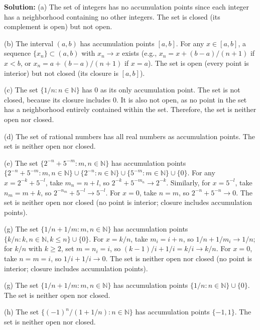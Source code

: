 \textbf{Solution:} 
(a) The set of integers has no accumulation points since each integer has a neighborhood containing no other integers. The set is closed (its complement is open) but not open.

(b) The interval $(a,b)$ has accumulation points $[a,b]$. For any $x \in [a,b]$, a sequence $\{x_n\} \subset (a,b)$ with $x_n \to x$ exists (e.g., $x_n = x + (b-a)/(n+1)$ if $x < b$, or $x_n = a + (b-a)/(n+1)$ if $x = a$). The set is open (every point is interior) but not closed (its closure is $[a,b]$).

(c) The set $\{1/n : n \in \mathbb{N}\}$ has 0 as its only accumulation point. The set is not closed, because its closure includes 0. It is also not open, as no point in the set has a neighborhood entirely contained within the set. Therefore, the set is neither open nor closed.


(d) The set of rational numbers has all real numbers as accumulation points. The set is neither open nor closed.

(e) The set $\{2^{-n} + 5^{-m} : m,n \in \mathbb{N}\}$ has accumulation points $\{2^{-n} + 5^{-m} : m,n \in \mathbb{N}\} \cup \{2^{-n} : n \in \mathbb{N}\} \cup \{5^{-m} : m \in \mathbb{N}\} \cup \{0\}$. For any $x = 2^{-k} + 5^{-l}$, take $m_n = n + l$, so $2^{-k} + 5^{-m_n} \to 2^{-k}$. Similarly, for $x = 5^{-l}$, take $n_m = m + k$, so $2^{-n_m} + 5^{-l} \to 5^{-l}$. For $x = 0$, take $n = m$, so $2^{-n} + 5^{-n} \to 0$. The set is neither open nor closed (no point is interior; closure includes accumulation points).

(g) The set $\{1/n + 1/m : m,n \in \mathbb{N}\}$ has accumulation points $\{k/n : k,n \in \mathbb{N}, k \leq n\} \cup \{0\}$. For $x = k/n$, take $m_i = i + n$, so $1/n + 1/m_i \to 1/n$; for $k/n$ with $k \geq 2$, set $m = n_i = i$, so $(k-1)/i + 1/i = k/i \to k/n$. For $x = 0$, take $n = m = i$, so $1/i + 1/i \to 0$. The set is neither open nor closed (no point is interior; closure includes accumulation points).

(g) The set $\{1/n + 1/m : m,n \in \mathbb{N}\}$ has accumulation points $\{1/n : n \in \mathbb{N}\} \cup \{0\}$. The set is neither open nor closed.

(h) The set $\{(-1)^n/(1+1/n) : n \in \mathbb{N}\}$ has accumulation points $\{-1, 1\}$. The set is neither open nor closed.

